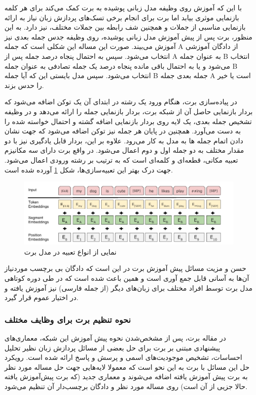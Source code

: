 با این که آموزش روی وظیفه مدل زبانی پوشیده به برت کمک می‌کند برای هر کلمه بازنمایی موثری بیابد اما برت برای انجام برخی تسک‌های پردازش زبان نیاز به ارائه بازنمایی مناسبی از جملات
و همچنین شف رابطه بین جملات مختلف،
 نیز دارد. به این منظور، برت پس از پیش آموزش مدل زبانی پوشیده، روی وظیفه جدس جمله بعدی نیز آموزش می‌بیند. صورت این مساله این شکلی است که جمله A از دادگان آموزشی انتخاب می‌شود. سپس به احتمال پنجاه درصد جمله پس از A به عنوان جمله B انتخاب می‌شود و یا به احتمال باقی مانده پنجاه درصد یک جمله تصادفی به عنوان جمله B انتخاب می‌شود. سپس مدل بایستی این که آیا جمله B جمله بعدی جمله A است یا خیر را حدس بزند. 

 در پیاده‌سازی برت، هنگام ورود یک رشته در ابتدای آن یک توکن
\lr{[CLS]}
اضافه می‌شود که بردار بازنمایی حاصل آن از شبکه برت، بردار بازنمایی جمله را ارائه می‌دهد و در وظیفه تشخیص جمله بعدی، یک لایه
روی بردار بازنمایی
\lr{[CLS]}
اضافه گشته و احتمال خواسته شده را به دست می‌آورد. همچنین در پایان هر جمله نیز توکن
\lr{[SEP]}
اضافه می‌شود که جهت نشان دادن اتمام جمله ها به مدل به کار می‌رود. علاوه بر این، بردار
قابل یادگیری نیز با دو مقدار مختلف به دو جمله اول و دوم اعمال می‌شود. در واقع برت دارای سه مکانیزم تعبیه مکانی، قطعه‌ای و کلمه‌ای است که به ترتیب بر رشته ورودی اعمال می‌شود. جهت درک بهتر این تعبیه‌سازی‌ها، شکل
\ref{fig:chap3:bert_embeddings}
 آورده شده است.

 \begin{figure}[h]
 	\centering
 	\includegraphics[width=1\textwidth]{images/chap3/bert_embeddings.png}
 	\caption{
 		نمایی از انواع تعبیه در مدل برت
 	}
 	\label{fig:chap3:bert_embeddings}
 \end{figure}

حسن و مزیت مسائل پیش آموزش برت در این است که دادگان بی برچسب موردنیاز آن‌ها به آسانی قابل جمع آوری است و همین باعث شده است که در طی دوره کوتاهی مدل برت 
توسط افراد مختلف
برای زبان‌های دیگر (از جمله فارسی) نیز آموزش یافته و در اختیار عموم قرار گیرد. 

\subsubsection{نحوه تنظیم برت برای وظایف مختلف}
در مقاله برت،‌ پس از مشخص‌شدن نحوه پیش آموزش این شبکه، معماری‌های پیشنهادی مبتنی بر برت برای حل بعضی از مسائل پردازش زبان نظیر تحلیل احساسات، تشخیص موجودیت‌های اسمی و پرسش و پاسخ ارائه شده است. رویکرد حل این مسائل با برت به این نحو است که معمولا لایه‌هایی جهت حل مساله مورد نظر به برت پیش آموزش یافته اضافه می‌شوند و معماری جدید (که برت پیش‌آموزش یافته حالا جزیی از آن است) روی مساله مورد نظر و دادگان برچسب‌دار آن تنظیم می‌شود. 

